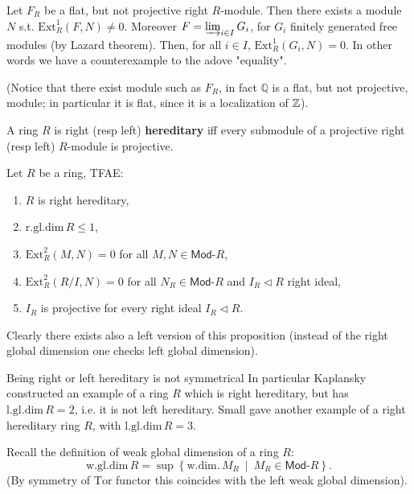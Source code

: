 \begin{ex}
	Let $F_R$ be a flat, but not projective right $R$-module.
	Then there exists a module $N$ s.t. $\mathrm{Ext}^1_R(F,N) \neq 0$.
	Moreover $F = \varinjlim_{i \in I} G_i$,
	for $G_i$ finitely generated free modules (by Lazard theorem).
	Then, for all $i \in I$, $\mathrm{Ext}^1_R(G_i, N) = 0$.
	In other words we have a counterexample to the adove "equality".

	(Notice that there exist module such as $F_R$, in fact $\mathbb{Q}$
	is a flat, but not projective, module;
	in particular it is flat, since it is a localization of $\mathbb{Z}$).
\end{ex} 

\begin{defn}
	A ring $R$ is right (resp left) \textbf{hereditary} iff every submodule of a projective right
	(resp left) $R$-module is projective.
\end{defn}

\begin{prop}
	Let $R$ be a ring, TFAE:
	\begin{enumerate}
		\item $R$ is right hereditary,
		\item $\mathrm{r.gl.dim}\, R \leq 1$,
		\item $\mathrm{Ext}^2_R(M,N) = 0$ for all $M, N \in \mathsf{Mod}\text{-}R$,
		\item $\mathrm{Ext}^2_R(R/I,N) = 0$ for all $N_R \in \mathsf{Mod}\text{-}R$ and $I_R \triangleleft R$
			right ideal,
		\item $I_R$ is projective for every right ideal $I_R \triangleleft R$.
	\end{enumerate}
	Clearly there exists also a left version of this proposition
	(instead of the right global dimension one checks left global dimension).
\end{prop} 

\begin{ex}
	Being right or left hereditary is not symmetrical
	In particular Kaplansky constructed an example of a ring $R$ which is right hereditary,
	but has $\mathrm{l.gl.dim}\, R = 2$, i.e. it is not left hereditary.
	Small gave another example of a right hereditary ring $R$, 
	with $\mathrm{l.gl.dim}\, R = 3$.
\end{ex} 

Recall the definition of weak global dimension of a ring $R$:
\begin{equation}
\mathrm{w.gl.dim}\, R = \sup \left\{ \mathrm{w.dim.}\, M_R \ \middle|\ M_R \in \mathsf{Mod}\text{-}R \right\}
.\end{equation} 
(By symmetry of $\mathrm{Tor}$ functor this coincides with the left weak global dimension).

